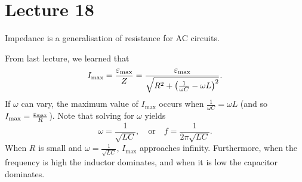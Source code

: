 \documentclass[class=article, crop=false]{standalone}
\begin{document}
  \section{Lecture 18}
  \begin{note}{}
    Impedance is a generalisation of resistance for AC circuits.
  \end{note}
  From last lecture, we learned that
  \[
    I_\text{max} = \frac{\varepsilon_\text{max}}{Z} = \frac{\varepsilon_\text{max}}{\sqrt{R^2 + \left( \frac{1}{\omega C} - \omega L \right)^2}}.
  \]
  If $\omega$ can vary, the maximum value of $I_\text{max}$ occurs when $\frac{1}{\omega C} = \omega L$ (and so $I_\text{max} = \frac{\varepsilon_\text{max}}{R}$). Note that solving for $\omega$ yields
  \[
    \omega = \frac{1}{\sqrt{LC}}, \quad\text{or}\quad f = \frac{1}{2\pi\sqrt{LC}}.
  \]
  When $R$ is small and $\omega = \frac{1}{\sqrt{LC}}$, $I_\text{max}$ approaches infinity. Furthermore, when the frequency is high the inductor dominates, and when it is low the capacitor dominates.
\end{document}
